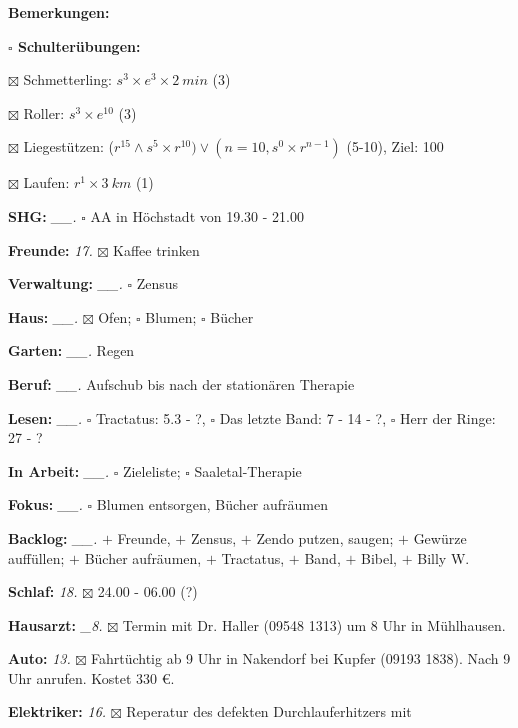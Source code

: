 \documentclass[10pt,a4paper]{article}
\newcommand\prop[1] {{\color {alizarin} {\bf #1}}}             %
\newcommand\opti[1] {{\color {amethyst} {\bf #1}}}             %
\newcommand\mand[1] {{\color {burntorange} {\bf #1}}}          %
\newcommand\bottomspace{\vskip 4pt}
\newcommand\n[1] { {\sl #1.} \hskip 5pt }
\begin{document}
\begin{mdframed}[style=daystyle]
\begin{labeling}{{\mand {Bemerkungen:}}}
\begin{minipage}{0.75\textwidth}
\begin{labeling}{\prop {$\square$ {Schulterübungen:}}}
      \item[$\boxtimes$ Schmetterling:]   $s^3 \times e^3 \times 2\ min$ (3)
      \item[$\boxtimes$ Roller:]          $s^3 \times e^{10}$ (3)
      \item[$\boxtimes$ Liegestützen:]    ($r^{15} \land s^5 \times r^{10}) \vee (n=10, s^0 \times r^{n-1})$
          (5-10), Ziel: 100
      \item[$\boxtimes$ Laufen:]          $r^1 \times 3\ km$ (1)
      \end{labeling}
    \end{minipage}
    \bottomspace        
  \item[{\mand {SHG:}}]          \n{\_\_} $\square$ AA in Höchstadt von 19.30 - 21.00
  \item[{\mand {Freunde:}}]        \n{17} $\boxtimes$ Kaffee trinken
  \item[{\mand {Verwaltung:}}]   \n{\_\_} $\square$ Zensus
  \item[{\mand {Haus:}}]         \n{\_\_} $\boxtimes$ Ofen; $\square$ Blumen; $\square$ Bücher
  \item[{\mand {Garten:}}]       \n{\_\_} Regen
  \item[{\mand {Beruf:}}]        \n{\_\_} Aufschub bis nach der stationären Therapie
  \item[{\mand {Lesen:}}]        \n{\_\_} $\square$ Tractatus: 5.3 - ?,
      $\square$ Das letzte Band: 7 - 14 - ?, $\square$ Herr der Ringe: 27 - ?
  \item[{\mand {In Arbeit:}}]    \n{\_\_} $\square$ Zieleliste; $\square$ Saaletal-Therapie
  \item[{\mand {Fokus:}}]        \n{\_\_} $\square$ Blumen entsorgen, Bücher aufräumen
  \item[{\mand {Backlog:}}]      \n{\_\_} $+$ Freunde,
    $+$ Zensus,
    $+$ Zendo putzen, saugen; $+$ Gewürze auffüllen; $+$ Bücher aufräumen,
    $+$ Tractatus, $+$ Band, $+$ Bibel, $+$ Billy W.
  \item[{\mand {Schlaf:}}]         \n{18} $\boxtimes$ 24.00 - 06.00 (?)
  \item[{\opti {Hausarzt:}}]      \n{\_8} $\boxtimes$ Termin mit Dr. Haller (09548 1313) um 8 Uhr
      in Mühlhausen.
    \item[{\opti {Auto:}}]         \n{13} $\boxtimes$ Fahrtüchtig ab 9 Uhr in Nakendorf bei
        Kupfer (09193 1838). Nach 9 Uhr anrufen. Kostet 330 \euro.
  \item[{\opti {Elektriker:}}]     \n{16} $\boxtimes$ Reperatur des defekten Durchlauferhitzers mit

\end{labeling}
\end{mdframed}
\end{document}
